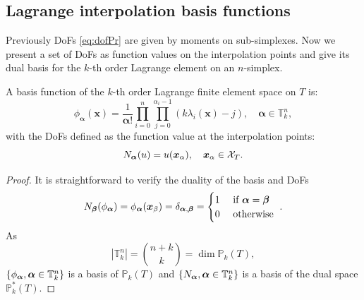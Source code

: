 \documentclass[mathpazo]{cicp}
\newcommand{\prox}{\operatorname{Prox}}
\begin{document}

\subsection{Lagrange interpolation basis functions}\label{sec:lagrangebasis}
Previously DoFs \eqref{eq:dofPr} are given by moments on sub-simplexes. Now we present a set of DoFs as function values on the interpolation points and give its dual basis for the $k$-th order Lagrange element on an $n$-simplex.

\begin{lemma}\label{le:li}
A basis function of the $k$-th order Lagrange finite element space on $T$ is:
$$
\phi_{\boldsymbol \alpha}(\boldsymbol x) = 
\frac{1}{\boldsymbol \alpha!} 
\prod_{i=0}^{n}\prod_{j =0}^{\alpha_i - 1} (k\lambda_i(\boldsymbol x) - j), \quad 
\boldsymbol \alpha \in \mathbb T^n_k,
$$
with the DoFs defined as the function value at the interpolation points:
$$
N_{\boldsymbol \alpha} (u) = u(\boldsymbol x_{\alpha}), \quad \boldsymbol x_{\alpha} \in \mathcal X_{T}.
$$
\end{lemma}
\begin{proof}
It is straightforward to verify the duality of the basis and DoFs 
$$
N_{\boldsymbol \beta}(\phi_{\boldsymbol \alpha}) = \phi_{\boldsymbol \alpha}(\boldsymbol x_{\beta}) = \delta_{\boldsymbol \alpha,\boldsymbol \beta} = 
\begin{cases}
1& \text{ if } \boldsymbol \alpha = \boldsymbol \beta\\
0 & \text{ otherwise }
\end{cases}.
$$
As $$| \mathbb T^{n}_k | = {n + k \choose k} = \dim \mathbb P_k(T),$$ $\{\phi_{\boldsymbol \alpha}, \boldsymbol \alpha\in  \mathbb T^{n}_k\}$ is a basis of $\mathbb P_k(T)$ and $\{N_{\boldsymbol \alpha}, \boldsymbol \alpha\in  \mathbb T^{n}_k\}$ is a basis of the dual space $\mathbb P_k^*(T)$.
\end{proof}
\end{document}
